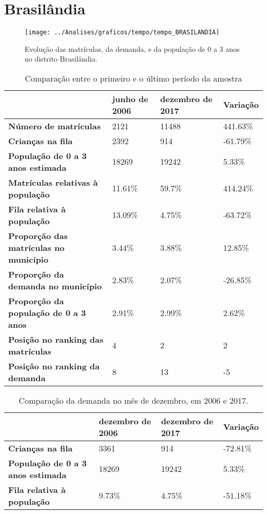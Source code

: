 \section{Brasilândia}
\begin{figure}[H]
\centering
\texttt{[image: ../Analises/graficos/tempo/tempo\_BRASILANDIA]}
\caption{Evolução das matrículas, da demanda, e da população de 0 a 3 anos no distrito Brasilândia.}
\end{figure}
\begin{table}[H]
\begin{tabular}{|l|l|l|l|}
\hline
\textbf{}                                      & \textbf{junho de 2006}       & \textbf{dezembro de 2017}    & \textbf{Variação} \\ \hline
\textbf{Número de matrículas}                  & 2121 & 11488 & 441.63\% \\ \hline
\textbf{Crianças na fila}                      & 2392 & 914 & -61.79\% \\ \hline
\textbf{População de 0 a 3 anos estimada}      & 18269 & 19242 & 5.33\% \\ \hline
\textbf{Matrículas relativas à população}      & 11.61\% & 59.7\% & 414.24\% \\ \hline
\textbf{Fila relativa à população}             & 13.09\% & 4.75\% & -63.72\% \\ \hline
\textbf{Proporção das matrículas no município} & 3.44\% & 3.88\% & 12.85\% \\ \hline
\textbf{Proporção da demanda no município}     & 2.83\% & 2.07\% & -26.85\% \\ \hline
\textbf{Proporção da população de 0 a 3 anos}  & 2.91\% & 2.99\% & 2.62\% \\ \hline
\textbf{Posição no ranking das matrículas}     & 4 & 2 & 2 \\ \hline
\textbf{Posição no ranking da demanda}         & 8 & 13 & -5 \\ \hline
\end{tabular}
\caption{Comparação entre o primeiro e o último período da amostra}
\end{table}
\begin{table}[H]
\begin{tabular}{|l|l|l|l|}
\hline
\textbf{}                                 & \textbf{dezembro de 2006} & \textbf{dezembro de 2017} & \textbf{Variação} \\ \hline
\textbf{Crianças na fila}                      & 3361 & 914 & -72.81\% \\ \hline
\textbf{População de 0 a 3 anos estimada}      & 18269 & 19242 & 5.33\% \\ \hline
\textbf{Fila relativa à população}             & 9.73\% & 4.75\% & -51.18\% \\ \hline
\end{tabular}
\caption{Comparação da demanda no mês de dezembro, em 2006 e 2017.}
\end{table}
